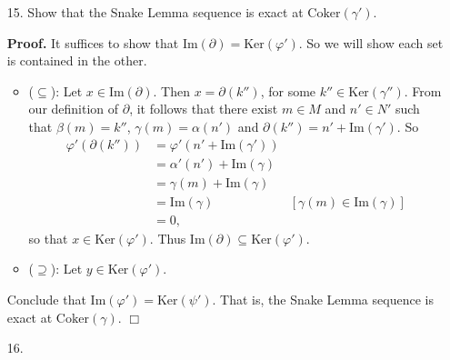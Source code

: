 \documentclass[9pt]{article}
\newcommand{\qed}{\hfill \ensuremath{\Box}}
\newcommand{\Ker}{\text{Ker}}
\newcommand{\Coker}{\text{Coker}}
\newcommand{\im}{\text{Im}}
\begin{document}
\begin{enumerate}
   \item[15.]  Show that the Snake Lemma sequence is exact at $\Coker(\gamma')$.

      \textbf{Proof.} It suffices to show that
      $\im(\partial) = \Ker(\varphi')$. So we will show each set is
      contained in the other.
      \begin{itemize}
         \item ($\subseteq$): Let $x \in \im(\partial)$. Then
               $x = \partial(k'')$, for some $k'' \in \Ker(\gamma'')$. From our
               definition of $\partial$, it follows that there exist $m \in M$
               and $n' \in N'$ such that $\beta(m) = k''$,
               $\gamma(m) = \alpha(n')$ and $\partial(k'') =n' + \im(\gamma')$.
               So
               \begin{align*}
                  \varphi'(\partial(k'')) &= \varphi'(n'+\im(\gamma')) \\
                     &= \alpha'(n') + \im(\gamma) \\
                     &= \gamma(m) + \im(\gamma) \\
                     &= \im(\gamma) &[\gamma(m) \in \im(\gamma)] \\
                     &= 0,
               \end{align*}
               so that $x \in \Ker(\varphi')$. Thus 
               $\im(\partial) \subseteq \Ker(\varphi')$.
         \item ($\supseteq$): Let $y \in \Ker(\varphi')$. 
      \end{itemize}
      Conclude that $\im(\varphi') = \Ker(\psi')$. That is, the
      Snake Lemma sequence is exact at $\Coker(\gamma)$. \qed
   \item[16.]  
\end{enumerate}
\end{document}
